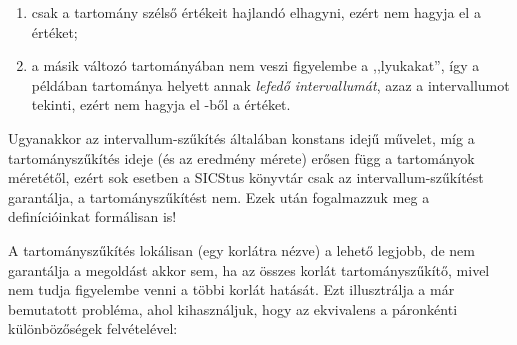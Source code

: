 \begin{enumerate}
\item csak a tartomány szélső értékeit hajlandó elhagyni, ezért nem hagyja el
a  értéket;
\item a másik változó tartományában nem veszi figyelembe a ,,lyukakat'', így
a példában  tartománya helyett annak \emph{lefedő intervallumát}, azaz
a  intervallumot tekinti, ezért nem hagyja el -ből
a  értéket.
\end{enumerate}

Ugyanakkor az intervallum-szűkítés általában konstans idejű művelet,
míg a tartományszűkítés ideje (és az eredmény mérete) erősen függ a
tartományok méretétől, ezért sok esetben a SICStus \clpfd könyvtár csak
az intervallum-szűkítést garantálja, a tartományszűkítést nem.
\br
Ezek után fogalmazzuk meg a definícióinkat formálisan is!



A tartományszűkítés lokálisan (egy korlátra nézve) a lehető legjobb, de
nem garantálja a megoldást akkor sem, ha az összes korlát tartományszűkítő,
mivel nem tudja figyelembe venni a többi korlát hatását. Ezt illusztrálja
a már bemutatott  probléma, ahol
kihasználjuk, hogy az  ekvivalens a páronkénti különbözőségek
felvételével:

